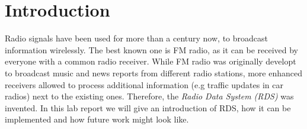 \documentclass[sigconf]{acmart}
\begin{document}
%
%





\maketitle

\section{Introduction}

Radio signals have been used for more than a century now, to broadcast
information wirelessly. The best known one is FM radio, as it can be
received by everyone with a common radio receiver. While FM radio was
originally developt to broadcast music and news reports from different
radio stations, more enhanced receivers allowed to process additional
information (e.g traffic updates in car radios) next to the existing
ones. Therefore, the \emph{Radio Data System (RDS)} was invented. In
this lab report we will give an introduction of RDS, how it can be
implemented and how future work might look like.
\end{document}
